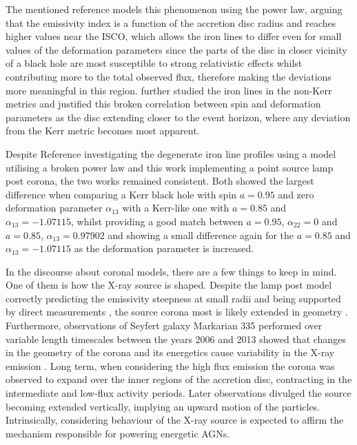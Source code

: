\documentclass[fleqn,usenatbib,useAMS]{mnras}
\begin{document}
The mentioned reference models this phenomenon using the power law, arguing that the emissivity index is a function of the accretion disc radius and reaches higher values near the ISCO, which allows the iron lines to differ even for small values of the deformation parameters since the parts of the disc in closer vicinity of a black hole are most susceptible to strong relativistic effects whilst contributing more to the total observed flux, therefore making the deviations more meaningful in this region. \cite{psaltis2011ray} further studied the iron lines in the non-Kerr metrics and justified this broken correlation between spin and deformation parameters as the disc extending closer to the event horizon, where any deviation from the Kerr metric becomes most apparent.

Despite Reference \cite{johannsen2014x} investigating the degenerate iron line profiles using a model utilising a broken power law and this work implementing a point source lamp post corona, the two works remained consistent. Both showed the largest difference when comparing a Kerr black hole with spin $a = 0.95$ and zero deformation parameter $\alpha_{13}$ with a Kerr-like one with $a = 0.85$ and $\alpha_{13} = -1.07115$, whilst providing a good match between $a = 0.95$,  $\alpha_{22} = 0$ and $a = 0.85$, $\alpha_{13} = 0.97902$ and showing a small difference again for the $a = 0.85$ and $\alpha_{13} = -1.07115$ as the deformation parameter is increased. 

In the discourse about coronal models, there are a few things to keep in mind. One of them is how the X-ray source is shaped. Despite the lamp post model correctly predicting the emissivity steepness at small radii and being supported by direct measurements \cite{wilkins2012understanding}, the source corona most is likely extended in geometry \cite{wilkins2015driving}. Furthermore, observations of Seyfert galaxy Markarian 335 performed over variable length timescales between the years 2006 and 2013 showed that changes in the geometry of the corona and its energetics cause variability in the X-ray emission \cite{wilkins2015driving}. Long term, when considering the high flux emission the corona was observed to expand over the inner regions of the accretion disc, contracting in the intermediate and low-flux activity periods. Later observations divulged the source becoming extended vertically, implying an upward motion of the particles. Intrinsically, considering behaviour of the X-ray source is expected to affirm the mechanism responsible for powering energetic AGNs.
\end{document}
